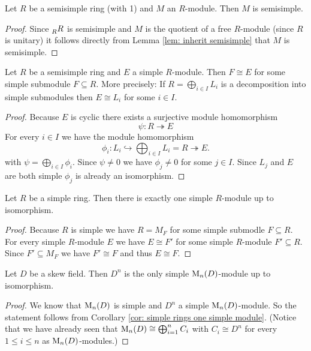 \begin{prop}
 Let $R$ be a semisimple ring (with 1) and $M$ an $R$-module. Then $M$ is semisimple.
\end{prop}
\begin{proof}
 Since $\prescript{}{R}{R}$ is semisimple and $M$ is the quotient of a free $R$-module (since $R$ is unitary) it follows directly from Lemma \ref{lem: inherit semisimple} that $M$ is semisimple.
\end{proof}


\begin{lem}\label{lem: simple module of semisimple ring is direct summand}
 Let $R$ be a semisimple ring and $E$ a simple $R$-module. Then $F \cong E$ for some simple submodule $F \subseteq R$. More precisely: If $R = \bigoplus_{i \in I} L_i$ is a decomposition into simple submodules then $E \cong L_i$ for some $i \in I$.
\end{lem}
\begin{proof}
 Because $E$ is cyclic there exists a surjective module homomorphism
 \[
  \psi \colon R \twoheadrightarrow E
 \]
 For every $i \in I$ we have the module homomorphism
 \[
  \phi_i \colon L_i \hookrightarrow \bigoplus_{i \in I} L_i = R \twoheadrightarrow E.
 \]
 with $\psi = \bigoplus_{i \in I} \phi_i$. Since $\psi \neq 0$ we have $\phi_j \neq 0$ for some $j \in I$. Since $L_j$ and $E$ are both simple $\phi_j$ is already an isomorphism.
\end{proof}


\begin{cor}\label{cor: simple rings one simple module}
 Let $R$ be a simple ring. Then there is exactly one simple $R$-module up to isomorphism.
\end{cor}
\begin{proof}
 Because $R$ is simple we have $R = M_F$ for some simple submodle $F \subseteq R$. For every simple $R$-module $E$ we have $E \cong F'$ for some simple $R$-module $F' \subseteq R$. Since $F' \subseteq M_F$ we have $F' \cong F$ and thus $E \cong F$.
\end{proof}


\begin{cor}\label{cor: D^n only simple M_n(D)-module}
 Let $D$ be a skew field. Then $D^n$ is the only simple $\operatorname{M}_n(D)$-module up to isomorphism.
\end{cor}
\begin{proof}
 We know that $\operatorname{M}_n(D)$ is simple and $D^n$ a simple $\operatorname{M}_n(D)$-module. So the statement follows from Corollary \ref{cor: simple rings one simple module}. (Notice that we have already seen that $\operatorname{M}_n(D) \cong \bigoplus_{i=1}^n C_i$ with $C_i \cong D^n$ for every $1 \leq i \leq n$ as $\operatorname{M}_n(D)$-modules.)
\end{proof}


